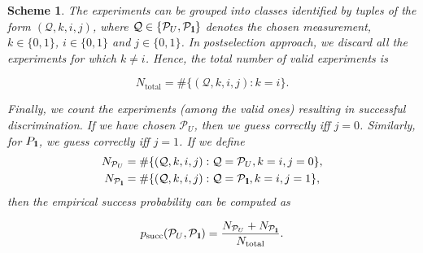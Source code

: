 \documentclass[preprint,12pt, a4paper, dvipsnames]{elsarticle}
\newcommand{\ket}[1]{\ensuremath{|#1\rangle}}
\newcommand{\bra}[1]{\ensuremath{\langle#1|}}
\newcommand{\ketbra}[2]{\ensuremath{\ket{#1}\bra{#2}}}
\newcommand{\proj}[1]{\ensuremath{\ketbra{#1}{#1}}}
\newcommand{\1}{{\rm 1\hspace{-0.9mm}l}}
\newcommand{\Id}{{\rm 1\hspace{-0.9mm}l}}
\newcommand{\PP}{\mathcal{P}}
\newcommand{\QQ}{\mathcal{Q}}
\newtheorem{scheme}{Scheme}
\begin{document}
\begin{scheme}
The experiments can be grouped into classes identified by tuples of the form
	$(\mathcal{Q}, k, i, j)$, where $\mathcal{Q} \in \{\PP_U, \PP_\Id\}$ denotes the chosen measurement, $k \in \{0,1\}$, $i \in \{0,1\}$ and $j \in \{0,1\}$.
	In postselection approach, we discard all the experiments for which $k \ne i$. Hence, the total number of valid experiments is

	\begin{equation}
	N_\text{total} = \#\{(\QQ, k, i, j): k = i \}.
	\end{equation}

	Finally, we count the experiments (among the valid ones) resulting in successful discrimination.
	If we have chosen $\PP_U$, then we guess correctly iff $j=0$. Similarly, for
	$P_\Id$, we guess correctly iff $j=1$. If we define
	\begin{eqnarray}
	N_{\PP_U} &= \#\{(\mathcal{Q}, k, i, j): \mathcal{Q} = \PP_U, k = i, j = 0\}, \\
	N_{\PP_\Id} &= \#\{(\mathcal{Q}, k, i, j): \mathcal{Q} = \PP_\Id, k = i, j = 1\},
	\end{eqnarray}
	then the empirical success probability can be computed as

	\begin{equation}
	p_{\text{succ}}(\PP_{U}, \PP_{\Id}) = \frac{N_{\PP_U} + N_{\PP_\Id}}{N_{\text{total}}}.
	\end{equation}

\end{scheme}
\end{document}
